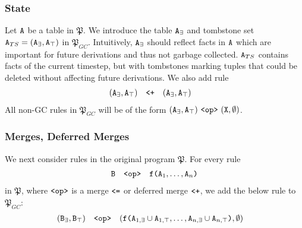 \subsubsection{State}
Let $\tt{A}$ be a table in $\mathfrak{P}$.
We introduce the table $\tt{A}_\exists$ and tombstone set $\tt{A}_{TS} = (\tt{A}_\exists, \tt{A}_\top)$ in $\mathfrak{P}_{GC}$.
Intuitively, $\tt{A}_\exists$ should reflect facts in $\tt{A}$ which are important for future derivations and thus not garbage collected.
$\tt{A}_{TS}$ contains facts of the current timestep, but with tombstones marking tuples that could be deleted without affecting future derivations.
We also add rule
\begin{align}
(\tt{A}_\exists, \tt{A}_\top) &\quad\tt{<+}\quad (\tt{A}_\exists, \tt{A}_\top)\label{eq:aexistmerge}
\end{align}
All non-GC rules in $\mathfrak{P}_{GC}$ will be of the form $(\tt{A}_\exists, \tt{A}_\top) ~\tt{<op>}~ (\tt{X}, \emptyset)$.


\subsubsection{Merges, Deferred Merges}
We next consider rules in the original program $\mathfrak{P}$.
For every rule
\begin{align}
\tt{B} \quad\tt{<op>}\quad \tt{f(}\tt{A}_1,\dots,\tt{A}_n\tt{)}
\end{align}
in $\mathfrak{P}$, where $\tt{<op>}$ is a merge $\tt{<=}$ or deferred merge $\tt{<+}$, we add the below rule to $\mathfrak{P}_{GC}$:
\begin{align*}
(\tt{B}_\exists, \tt{B}_\top) &\quad\tt{<op>}\quad (\tt{f(}\tt{A}_{1,\exists} \cup \tt{A}_{1,\top},\dots,\tt{A}_{n,\exists} \cup \tt{A}_{n,\top}\tt{)}, \emptyset)
\end{align*}

